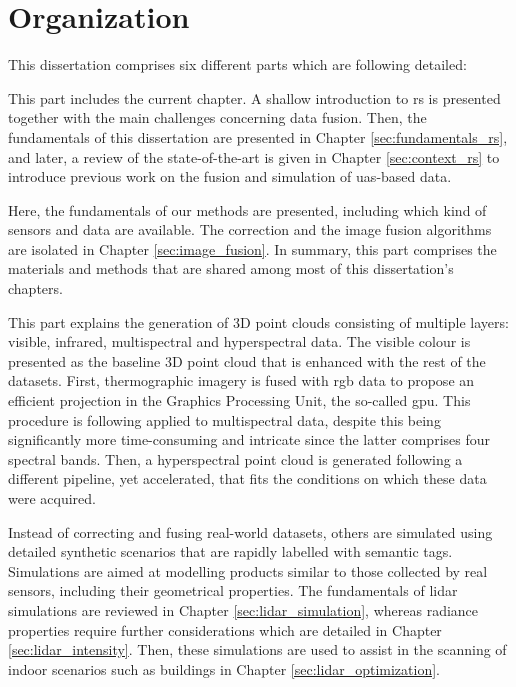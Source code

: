 \section{Organization}

This dissertation comprises six different parts which are following detailed:

\newcommand{\partTabSize}{1mm}

\small \noindent \textbf{} \normalsize\hspace{\partTabSize} This part includes the current chapter. A shallow introduction to \acrshort{rs} is presented together with the main challenges concerning data fusion. Then, the fundamentals of this dissertation are presented in Chapter \ref{sec:fundamentals_rs}, and later, a review of the state-of-the-art is given in Chapter \ref{sec:context_rs} to introduce previous work on the fusion and simulation of \acrshort{uas}-based data.

\small \noindent \textbf{} \normalsize\hspace{\partTabSize} Here, the fundamentals of our methods are presented, including which kind of sensors and data are available. The correction and the image fusion algorithms are isolated in Chapter \ref{sec:image_fusion}. In summary, this part comprises the materials and methods that are shared among most of this dissertation's chapters.

\small \noindent \textbf{} \normalsize\hspace{\partTabSize} This part explains the generation of 3D point clouds consisting of multiple layers: visible, infrared, multispectral and hyperspectral data. The visible colour is presented as the baseline 3D point cloud that is enhanced with the rest of the datasets. First, thermographic imagery is fused with \acrshort{rgb} data to propose an efficient projection in the Graphics Processing Unit, the so-called \acrshort{gpu}. This procedure is following applied to multispectral data, despite this being significantly more time-consuming and intricate since the latter comprises four spectral bands. Then, a hyperspectral point cloud is generated following a different pipeline, yet accelerated, that fits the conditions on which these data were acquired.  

\small \noindent \textbf{} \normalsize\hspace{\partTabSize} Instead of correcting and fusing real-world datasets, others are simulated using detailed synthetic scenarios that are rapidly labelled with semantic tags. Simulations are aimed at modelling products similar to those collected by real sensors, including their geometrical properties. The fundamentals of \acrshort{lidar} simulations are reviewed in Chapter \ref{sec:lidar_simulation}, whereas radiance properties require further considerations which are detailed in Chapter \ref{sec:lidar_intensity}. Then, these simulations are used to assist in the scanning of indoor scenarios such as buildings in Chapter \ref{sec:lidar_optimization}.

